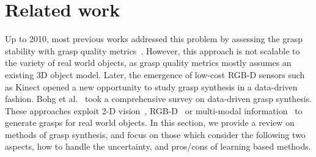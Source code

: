 \section{Related work}
Up to 2010, most previous works addressed this problem by assessing the grasp stability with grasp quality metrics~\cite{Ferrari1992}. However, this approach is not scalable to the variety of real world objects, as grasp quality metrics mostly assumes an existing 3D object model. Later, the emergence of low-cost RGB-D sensors such as Kinect opened a new opportunity to study grasp synthesis in a data-driven fashion. Bohg et al.~\cite{Bohg2014} took a comprehensive survey on data-driven grasp synthesis. These approaches exploit 2-D vision~\cite{Glover2008}, RGB-D~\cite{Berenson2007} or multi-modal information~\cite{Bohg2010} to generate grasps for real world objects. In this section, we provide a review on methods of grasp synthesis, and focus on those which consider the following two aspects, how to handle the uncertainty, and pros/cons of learning based methods. 


